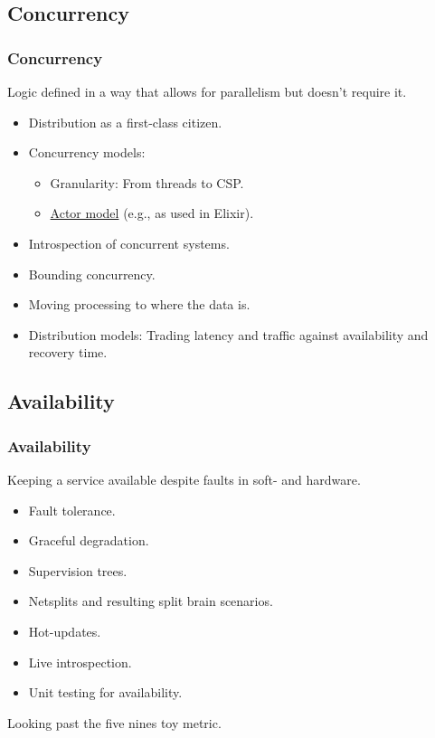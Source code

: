 \subsection{Concurrency}
\begin{frame}
  \frametitle{Concurrency}
  \vspace{3mm}
  Logic defined in a way that allows for parallelism but doesn't require it.
  \vspace{5mm}
  \begin{itemize}
    \item Distribution as a first-class citizen.
    \item Concurrency models:
      \begin{itemize}
        \item Granularity: From threads to CSP.
        \item \href{https://www.youtube.com/watch?v=ELwEdb_pD0k}{Actor model} (e.g., as used in Elixir).
      \end{itemize}
    \item Introspection of concurrent systems.
    \item Bounding concurrency.
    \item Moving processing to where the data is.
    \item Distribution models: Trading latency and traffic against availability and recovery time.
  \end{itemize}
\end{frame}

\subsection{Availability}
\begin{frame}
  \frametitle{Availability}
  \vspace{3mm}
  Keeping a service available despite faults in soft- and hardware. 
  \vspace{5mm}
  \begin{itemize}
    \item Fault tolerance.
    \item Graceful degradation.
    \item Supervision trees.
    \item Netsplits and resulting split brain scenarios.
    \item Hot-updates.
    \item Live introspection.
    \item Unit testing for availability.
  \end{itemize}
  
  \vspace{5mm}
  Looking past the five nines toy metric.
\end{frame}

